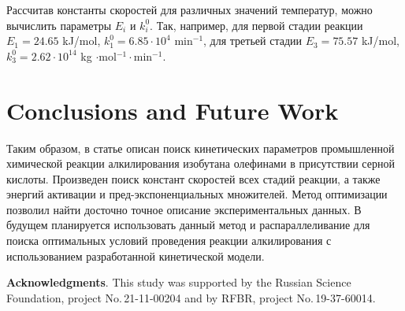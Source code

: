 \documentclass{svproc}
\begin{document}
Рассчитав константы скоростей для различных значений температур, можно вычислить параметры $E_i$ и $k_i^0$. Так, например, для первой стадии реакции $E_1 = 24.65$ kJ/mol, $k_1^0 = 6.85 \cdot 10^4$ min$^{-1}$, для третьей стадии $E_3 = 75.57$ kJ/mol, $k_3^0 = 2.62 \cdot 10^{14}$ kg $\cdot$mol$^{-1}\cdot$min$^{-1}$.

\section{Conclusions and Future Work}
Таким образом, в статье описан поиск кинетических параметров промышленной химической реакции алкилирования изобутана олефинами в присутствии серной кислоты. Произведен поиск констант скоростей всех стадий реакции, а также энергий активации и пред-экспоненциальных множителей. Метод оптимизации позволил найти досточно точное описание экспериментальных данных. В будущем планируется использовать данный метод и распараллеливание для поиска оптимальных условий проведения реакции алкилирования с использованием разработанной кинетической модели.


\medskip

\textbf{Acknowledgments}. This study was supported by the Russian Science Foundation, project No.\,21-11-00204 and by RFBR, project No.\,19-37-60014.

%
%

{}
\end{document}
